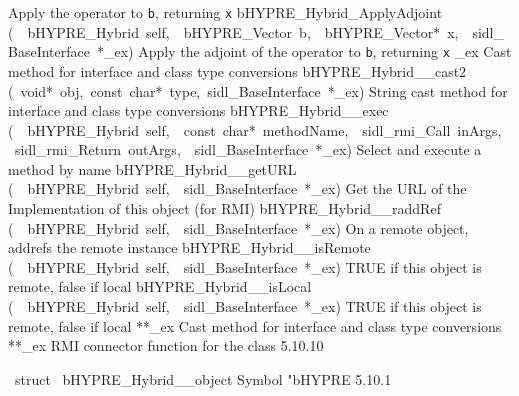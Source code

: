 \documentclass{article}
\begin{document}
\begin{cxxentry}
\begin{cxxentry}
\begin{cxxnames}
        {
Apply the operator to {\tt b}, returning {\tt x}}
        {}
\label{cxx.5.10.29}
        {bHYPRE\_Hybrid\_ApplyAdjoint}
        {(\ \ bHYPRE\_Hybrid\ self,\ \ bHYPRE\_Vector\ b,\ \ bHYPRE\_Vector*\ x,\ \ sidl\_BaseInterface\ *\_ex)}
        {
Apply the adjoint of the operator to {\tt b}, returning {\tt x}}
        {}
\label{cxx.5.10.30}
        {\_ex}
        {}
        {
Cast method for interface and class type conversions}
        {}
\label{cxx.5.10.31}
        {bHYPRE\_Hybrid\_\_cast2}
        {(\ void*\ obj,\ const\ char*\ type,\ sidl\_BaseInterface\ *\_ex)}
        {
String cast method for interface and class type conversions}
        {}
\label{cxx.5.10.32}
        {bHYPRE\_Hybrid\_\_exec}
        {(\ \ bHYPRE\_Hybrid\ self,\ \ const\ char*\ methodName,\ \ sidl\_rmi\_Call\ inArgs,\ \ sidl\_rmi\_Return\ outArgs,\ \ sidl\_BaseInterface\ *\_ex)}
        {
Select and execute a method by name}
        {}
\label{cxx.5.10.33}
        {bHYPRE\_Hybrid\_\_getURL}
        {(\ \ bHYPRE\_Hybrid\ self,\ \ sidl\_BaseInterface\ *\_ex)}
        {
Get the URL of the Implementation of this object (for RMI)}
        {}
\label{cxx.5.10.34}
        {bHYPRE\_Hybrid\_\_raddRef}
        {(\ \ bHYPRE\_Hybrid\ self,\ \ sidl\_BaseInterface\ *\_ex)}
        {
On a remote object, addrefs the remote instance}
        {}
\label{cxx.5.10.35}
        {bHYPRE\_Hybrid\_\_isRemote}
        {(\ \ bHYPRE\_Hybrid\ self,\ \ sidl\_BaseInterface\ *\_ex)}
        {
TRUE if this object is remote, false if local}
        {}
\label{cxx.5.10.36}
        {bHYPRE\_Hybrid\_\_isLocal}
        {(\ \ bHYPRE\_Hybrid\ self,\ \ sidl\_BaseInterface\ *\_ex)}
        {
TRUE if this object is remote, false if local}
        {}
\label{cxx.5.10.37}
        {**\_ex}
        {}
        {
Cast method for interface and class type conversions}
        {}
\label{cxx.5.10.38}
        {**\_ex}
        {}
        {
RMI connector function for the class}
        {5.10.10}
\end{cxxnames}
\begin{cxxvariable}
{\ struct\ }
        {bHYPRE\_Hybrid\_\_object}
        {}
        {
Symbol "bHYPRE}
        {5.10.1}
\begin{cxxdoc}


\end{cxxdoc}
\end{cxxvariable}
\end{cxxentry}
\end{cxxentry}
\end{document}

